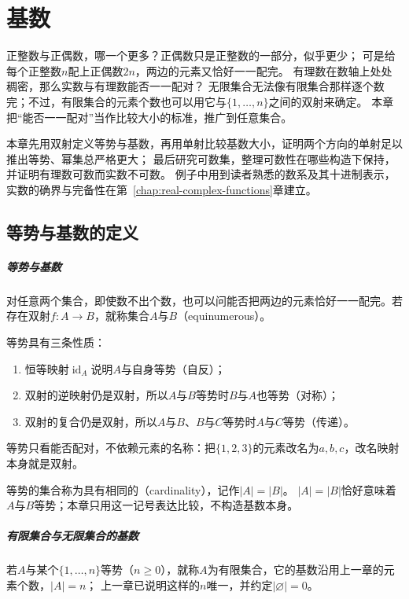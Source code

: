 \chapter{基数}
\label{chap:cardinality}

正整数与正偶数，哪一个更多？正偶数只是正整数的一部分，似乎更少；
可是给每个正整数$n$配上正偶数$2n$，两边的元素又恰好一一配完。
有理数在数轴上处处稠密，那么实数与有理数能否一一配对？
无限集合无法像有限集合那样逐个数完；不过，有限集合的元素个数也可以用它与$\{1,\ldots,n\}$之间的双射来确定。
本章把“能否一一配对”当作比较大小的标准，推广到任意集合。

本章先用双射定义等势与基数，再用单射比较基数大小，证明两个方向的单射足以推出等势、幂集总严格更大；
最后研究可数集，整理可数性在哪些构造下保持，并证明有理数可数而实数不可数。
例子中用到读者熟悉的数系及其十进制表示，实数的确界与完备性在第~\ref{chap:real-complex-functions}章建立。

\section{等势与基数的定义}
\label{sec:comb-cardinality}
\label{sec:comb-equinumerosity-cardinality}

\paragraph{等势与基数}
对任意两个集合，即使数不出个数，也可以问能否把两边的元素恰好一一配完。若存在双射$f:A\to B$，就称集合$A$与$B$（equinumerous）。

等势具有三条性质：
\begin{enumerate}
\item 恒等映射$\operatorname{id}_A$说明$A$与自身等势（自反）；
\item 双射的逆映射仍是双射，所以$A$与$B$等势时$B$与$A$也等势（对称）；
\item 双射的复合仍是双射，所以$A$与$B$、$B$与$C$等势时$A$与$C$等势（传递）。
\end{enumerate}

等势只看能否配对，不依赖元素的名称：把$\{1,2,3\}$的元素改名为$a,b,c$，改名映射本身就是双射。

等势的集合称为具有相同的（cardinality），记作$|A|=|B|$。
$|A|=|B|$恰好意味着$A$与$B$等势；本章只用这一记号表达比较，不构造基数本身。

\paragraph{有限集合与无限集合的基数}
若$A$与某个$\{1,\ldots,n\}$等势（$n\geq0$），就称$A$为有限集合，它的基数沿用上一章的元素个数，$|A|=n$；
上一章已说明这样的$n$唯一，并约定$|\varnothing|=0$。

